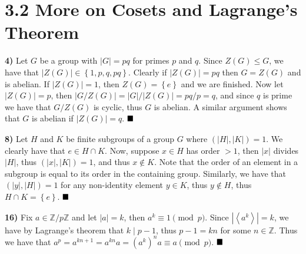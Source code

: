 \documentclass[12pt]{article}
\newcommand{\Z}{\mathbb{Z}}
\newcommand{\angleb}[1]{\left\langle#1\right\rangle}
\newcommand{\braceb}[1]{\left\{#1\right\}}
\newcommand{\vertb}[1]{\left\vert#1\right\vert}
\newcommand{\done}{\ensuremath{\strut\hfill\blacksquare}}
\begin{document}
\section*{3.2 More on Cosets and Lagrange's Theorem}

\textbf{4)}
Let \( G \) be a group with \( \vertb{G} = pq \) for primes \( p \) and
\( q \).
Since \( Z(G) \leq G \), we have that
\( \vertb{Z(G)} \in \braceb{1, p, q, pq} \).
Clearly if \( \vertb{Z(G)} = pq \) then \( G = Z(G) \) and is abelian.
If \( \vertb{Z(G)} = 1 \), then \( Z(G) = \braceb{e} \) and we are finished.
Now let \( \vertb{Z(G)} = p \), then
\( \vertb{G/Z(G)} = \vertb{G} / \vertb{Z(G)} = pq/p = q \), and since \( q \)
is prime we have that \( G/Z(G) \) is cyclic, thus \( G \) is abelian.
A similar argument shows that \( G \) is abelian if \( \vertb{Z(G)} = q \).
\done

\textbf{8)}
Let \( H \) and \( K \) be finite subgroups of a group \( G \) where
\( (\vertb{H}, \vertb{K}) = 1 \).
We clearly have that \( e \in H \cap K \).
Now, suppose \( x \in H \) has order \( > 1 \), then \( \vertb{x} \) divides
\( \vertb{H} \), thus \( (\vertb{x}, \vertb{K}) = 1 \), and thus
\( x \notin K \).
Note that the order of an element in a subgroup is equal to its order in the
containing group.
Similarly, we have that \( (\vertb{y}, \vertb{H}) = 1 \) for any non-identity
element \( y \in K \), thus \( y \notin H \), thus \( H \cap K = \braceb{e} \).
\done

\textbf{16)}
Fix \( a \in \Z/p\Z \) and let \( \vertb{a} = k \), then
\( a^k \equiv 1 \pmod{p} \).
Since \( \vertb{\angleb{a^k}} = k \), we have by Lagrange's theorem that
\( k \mid p - 1 \), thus \( p - 1 = kn \) for some \( n \in \Z \).
Thus we have that
\( a^p = a^{kn + 1} = a^{kn}a = (a^k)^na \equiv a \pmod{p} \).
\done
\end{document}
